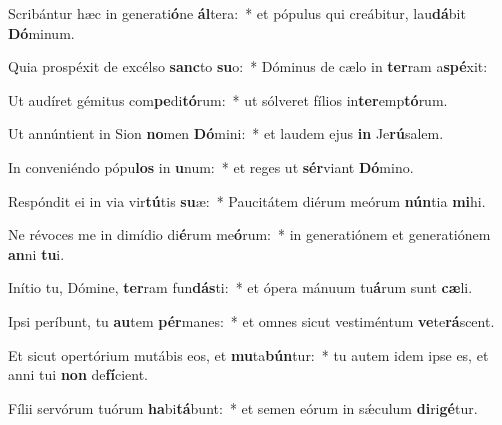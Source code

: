 \item Scribántur hæc in generati\textbf{ó}ne \textbf{ál}tera:~* et pópulus qui creábitur, lau\textbf{dá}bit \textbf{Dó}minum.
\item Quia prospéxit de excélso \textbf{sanc}to \textbf{su}o:~* Dóminus de cælo in \textbf{ter}ram a\textbf{spé}xit:
\item Ut audíret gémitus com\textbf{pe}di\textbf{tó}rum:~* ut sólveret fílios in\textbf{ter}emp\textbf{tó}rum.
\item Ut annúntient in Sion \textbf{no}men \textbf{Dó}mini:~* et laudem ejus \textbf{in} Je\textbf{rú}salem.
\item In conveniéndo pópu\textbf{los} in \textbf{u}num:~* et reges ut \textbf{sér}viant \textbf{Dó}mino.
\item Respóndit ei in via vir\textbf{tú}tis \textbf{su}æ:~* Paucitátem diérum meórum \textbf{nún}tia \textbf{mi}hi.
\item Ne révoces me in dimídio di\textbf{é}rum me\textbf{ó}rum:~* in generatiónem et generatiónem \textbf{an}ni \textbf{tu}i.
\item Inítio tu, Dómine, \textbf{ter}ram fun\textbf{dás}ti:~* et ópera mánuum tu\textbf{á}rum sunt \textbf{cæ}li.
\item Ipsi períbunt, tu \textbf{au}tem \textbf{pér}manes:~* et omnes sicut vestiméntum \textbf{ve}te\textbf{rá}scent.
\item Et sicut opertórium mutábis eos, et \textbf{mu}ta\textbf{bún}tur:~* tu autem idem ipse es, et anni tui \textbf{non} de\textbf{fí}cient.
\item Fílii servórum tuórum \textbf{ha}bi\textbf{tá}bunt:~* et semen eórum in sǽculum \textbf{di}ri\textbf{gé}tur.
